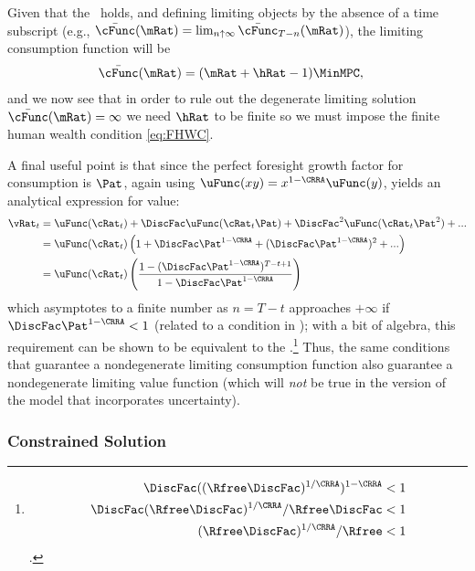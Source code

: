 \documentclass[./BufferStockTheory.tex]{subfiles}
\begin{document}
Given that the \RIC~holds, and defining limiting objects by the absence of a time subscript (e.g., $\bar{\cFunc}(\mRat)=\lim_{n \uparrow \infty} \bar{\cFunc}_{T-n}(\mRat)$), the limiting consumption function will be
\begin{align}\label{eq:cFuncPFUnc}
  \bar{\cFunc}(\mRat)  & = (\mRat+\hRat-1)\MinMPC, 
\end{align}
and we now see that in order to rule out the degenerate limiting
solution $\bar{\cFunc}(\mRat) = \infty$ we need $\hRat$ to be finite so we
must impose the finite human wealth condition \eqref{eq:FHWC}.

\hypertarget{ValuePFAnalytical}{}
A final useful point is that since the perfect foresight
growth factor for consumption is $\Pat$, again using $\uFunc(xy) =
x^{1-\CRRA}\uFunc(y)$, yields an analytical expression for value:  
\begin{align}
  \vRat_{t}  & = \uFunc(\cRat_{t})+\DiscFac \uFunc(\cRat_{t}\Pat)+\DiscFac^{2} \uFunc(\cRat_{t} \Pat^{2})+... \label{eq:ValuePFAnalytical}
\\  & = \uFunc(\cRat_{t})\left(1+\DiscFac \Pat^{1-\CRRA}+(\DiscFac \Pat^{1-\CRRA})^{2}+...\right) \notag 
\\  & = \uFunc(\cRat_{t})\left(\frac{1-(\DiscFac \Pat^{1-\CRRA})^{T-t+1}}{1-\DiscFac \Pat^{1-\CRRA}}\right) \notag
\end{align}
which asymptotes to a finite number as $n=T-t$ approaches $+\infty$ if $\DiscFac \Pat^{1-\CRRA} < 1$ (related to a condition in \cite{asHomogeneous}); with a bit of algebra, this requirement can be shown to be equivalent to the \RIC.\footnote{
\begin{align*}
   \DiscFac ((\Rfree \DiscFac)^{1/\CRRA})^{1-\CRRA}  & < 1
\\ \DiscFac (\Rfree\DiscFac)^{1/\CRRA}/\Rfree\DiscFac  & < 1
\\ (\Rfree \DiscFac)^{1/\CRRA} /\Rfree  & < 1
\end{align*}.
}  Thus, the same conditions that guarantee a nondegenerate limiting consumption function also guarantee a nondegenerate limiting value function (which will \textit{not} be true in the version of the model that incorporates uncertainty).


\hypertarget{Constrained-Solution}{}
\subsubsection{Constrained Solution}
\end{document}
